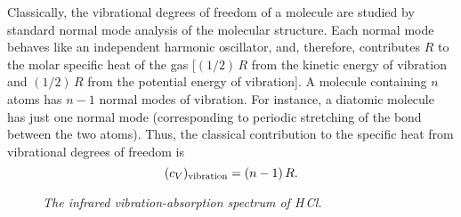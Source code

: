 Classically, the vibrational degrees of freedom of a molecule are studied by 
standard normal mode analysis of the
molecular 
structure. Each normal mode  behaves like an 
independent harmonic oscillator, and, therefore, 
contributes $R$  to the molar specific heat of the gas [$(1/2)\,R$ from the
kinetic energy of vibration and $(1/2)\,R$ from the potential energy of
vibration]. A molecule containing $n$ atoms has $n-1$ normal modes of vibration.
For instance, a diatomic molecule has just one normal mode (corresponding to
periodic stretching of the bond between the two atoms). Thus, the classical
contribution to the specific heat from vibrational degrees of freedom is
\begin{equation}
(c_V)_{\rm vibration} = (n-1)\, R.
\end{equation}
 
\begin{figure}[ht]
\epsfysize=3in
\centerline{}
\caption{\em The infrared vibration-absorption spectrum of H\,Cl.}\label{f1}
\end{figure}

